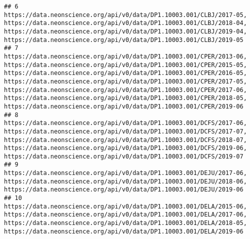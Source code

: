 \documentclass[]{book}
\begin{document}
\begin{verbatim}
## 6                                                                                                                                                                                                                                                                                                                                                           https://data.neonscience.org/api/v0/data/DP1.10003.001/CLBJ/2017-05, https://data.neonscience.org/api/v0/data/DP1.10003.001/CLBJ/2018-04, https://data.neonscience.org/api/v0/data/DP1.10003.001/CLBJ/2019-04, https://data.neonscience.org/api/v0/data/DP1.10003.001/CLBJ/2019-05
## 7                                                                                                                                            https://data.neonscience.org/api/v0/data/DP1.10003.001/CPER/2013-06, https://data.neonscience.org/api/v0/data/DP1.10003.001/CPER/2015-05, https://data.neonscience.org/api/v0/data/DP1.10003.001/CPER/2016-05, https://data.neonscience.org/api/v0/data/DP1.10003.001/CPER/2017-05, https://data.neonscience.org/api/v0/data/DP1.10003.001/CPER/2017-06, https://data.neonscience.org/api/v0/data/DP1.10003.001/CPER/2018-05, https://data.neonscience.org/api/v0/data/DP1.10003.001/CPER/2019-06
## 8                                                                                                                                                                                                                                                                                      https://data.neonscience.org/api/v0/data/DP1.10003.001/DCFS/2017-06, https://data.neonscience.org/api/v0/data/DP1.10003.001/DCFS/2017-07, https://data.neonscience.org/api/v0/data/DP1.10003.001/DCFS/2018-07, https://data.neonscience.org/api/v0/data/DP1.10003.001/DCFS/2019-06, https://data.neonscience.org/api/v0/data/DP1.10003.001/DCFS/2019-07
## 9                                                                                                                                                                                                                                                                                                                                                                                                                                https://data.neonscience.org/api/v0/data/DP1.10003.001/DEJU/2017-06, https://data.neonscience.org/api/v0/data/DP1.10003.001/DEJU/2018-06, https://data.neonscience.org/api/v0/data/DP1.10003.001/DEJU/2019-06
## 10                                                                                                                                                                                                                                                                                                                                                          https://data.neonscience.org/api/v0/data/DP1.10003.001/DELA/2015-06, https://data.neonscience.org/api/v0/data/DP1.10003.001/DELA/2017-06, https://data.neonscience.org/api/v0/data/DP1.10003.001/DELA/2018-05, https://data.neonscience.org/api/v0/data/DP1.10003.001/DELA/2019-06

\end{verbatim}
\end{document}

